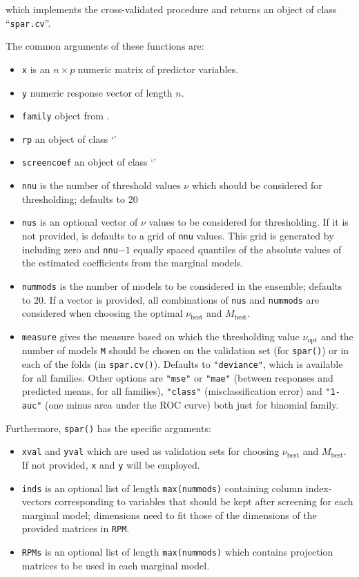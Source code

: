 \documentclass[
  article]{jss}
\newcommand{\class}[1]{`\code{#1}'}
\newcommand{\fct}[1]{\code{#1()}}
\begin{document}
which implements the cross-validated procedure and returns an object of
class ``\texttt{spar.cv}''.

The common arguments of these functions are:

\begin{itemize}
\item
  \texttt{x} is an \(n \times p\) numeric matrix of predictor variables.
\item
  \texttt{y} numeric response vector of length \(n\).
\item
  \texttt{family} object from \fct{stats::family}.
\item
  \texttt{rp} an object of class \class{randomprojection}
\item
  \texttt{screencoef} an object of class \class{screencoef}
\item
  \texttt{nnu} is the number of threshold values \(\nu\) which should be
  considered for thresholding; defaults to 20
\item
  \texttt{nus} is an optional vector of \(\nu\) values to be considered
  for thresholding. If it is not provided, is defaults to a grid of
  \texttt{nnu} values. This grid is generated by including zero and
  \texttt{nnu}\(-1\) equally spaced quantiles of the absolute values of
  the estimated coefficients from the marginal models.
\item
  \texttt{nummods} is the number of models to be considered in the
  ensemble; defaults to 20. If a vector is provided, all combinations of
  \texttt{nus} and \texttt{nummods} are considered when choosing the
  optimal \(\nu_\text{best}\) and \(M_\text{best}\).
\item
  \texttt{measure} gives the measure based on which the thresholding
  value \(\nu_\text{opt}\) and the number of models \texttt{M} should be
  chosen on the validation set (for \texttt{spar()}) or in each of the
  folds (in \texttt{spar.cv()}). Defaults to \texttt{"deviance"}, which
  is available for all families. Other options are \texttt{"mse"} or
  \texttt{"mae"} (between responses and predicted means, for all
  families), \texttt{"class"} (misclassification error) and
  \texttt{"1-auc"} (one minus area under the ROC curve) both just for
  binomial family.
\end{itemize}

Furthermore, \texttt{spar()} has the specific arguments:

\begin{itemize}
\item
  \texttt{xval} and \texttt{yval} which are used as validation sets for
  choosing \(\nu_\text{best}\) and \(M_\text{best}\). If not provided,
  \texttt{x} and \texttt{y} will be employed.
\item
  \texttt{inds} is an optional list of length \texttt{max(nummods)}
  containing column index-vectors corresponding to variables that should
  be kept after screening for each marginal model; dimensions need to
  fit those of the dimensions of the provided matrices in \texttt{RPM}.
\item
  \texttt{RPMs} is an optional list of length \texttt{max(nummods)}
  which contains projection matrices to be used in each marginal model.
\end{itemize}
\end{document}
